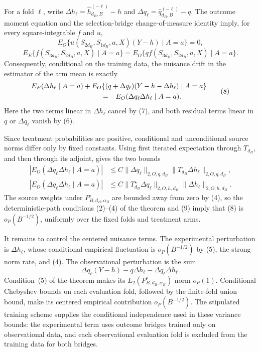 For a fold \(\ell\), write \(\Delta h_\ell=\widehat h_{d_B,B}^{(-\ell)}-h\) and \(\Delta q_\ell=\widehat q_{d_B,B}^{(-\ell)}-q\).  The outcome moment equation and the selection-bridge change-of-measure identity imply, for every square-integrable \(f\) and \(u\),
\[
 E_O\{u(S_{2d_B},S_{1d_B},a,X)(Y-h)\mid A=a\}=0,
 \tag{6}
\]
\[
 E_E\{f(S_{3d_B},S_{2d_B},a,X)\mid A=a\}
 =E_O\{q f(S_{3d_B},S_{2d_B},a,X)\mid A=a\}.
 \tag{7}
\]
Consequently, conditional on the training data, the nuisance drift in the estimator of the arm mean is exactly
\[
\begin{aligned}
 &E_E(\Delta h_\ell\mid A=a)
 +E_O\{(q+\Delta q_\ell)(Y-h-\Delta h_\ell)\mid A=a\}\\
 &\hspace{35mm}=-E_O(\Delta q_\ell\Delta h_\ell\mid A=a).
\end{aligned}
 \tag{8}
\]
Here the two terms linear in \(\Delta h_\ell\) cancel by (7), and both residual terms linear in \(q\) or \(\Delta q_\ell\) vanish by (6).

Since treatment probabilities are positive, conditional and unconditional source norms differ only by fixed constants.  Using first iterated expectation through \(T_{d_B}\), and then through its adjoint, gives the two bounds
\[
\begin{aligned}
 |E_O(\Delta q_\ell\Delta h_\ell\mid A=a)|
 &\le C\|\Delta q_\ell\|_{2,O,q,d_B}
       \|T_{d_B}\Delta h_\ell\|_{2,O,q,d_B},\\
 |E_O(\Delta q_\ell\Delta h_\ell\mid A=a)|
 &\le C\|T_{d_B}^{\star}\Delta q_\ell\|_{2,O,h,d_B}
       \|\Delta h_\ell\|_{2,O,h,d_B}.
\end{aligned}
 \tag{9}
\]
The source weights under \(P_{B,d_B,\alpha_B}^{\circ}\) are bounded away from zero by (4), so the deterministic-path conditions (2)--(4) of the theorem and (9) imply that (8) is \(o_P(B^{-1/2})\), uniformly over the fixed folds and treatment arms.

It remains to control the centered nuisance terms.  The experimental perturbation is \(\Delta h_\ell\), whose conditional empirical fluctuation is \(o_P(B^{-1/2})\) by (5), the strong-norm rate, and (4).  The observational perturbation is the sum
\[
 \Delta q_\ell(Y-h)-q\Delta h_\ell-\Delta q_\ell\Delta h_\ell.
 \tag{10}
\]
Condition~(5) of the theorem makes its \(L_2(P_{B,d_B,\alpha_B}^{\circ})\) norm \(o_P(1)\).  Conditional Chebyshev bounds on each evaluation fold, followed by the finite-fold union bound, make its centered empirical contribution \(o_P(B^{-1/2})\).  The stipulated training scheme supplies the conditional independence used in these variance bounds: the experimental term uses outcome bridges trained only on observational data, and each observational evaluation fold is excluded from the training data for both bridges.

